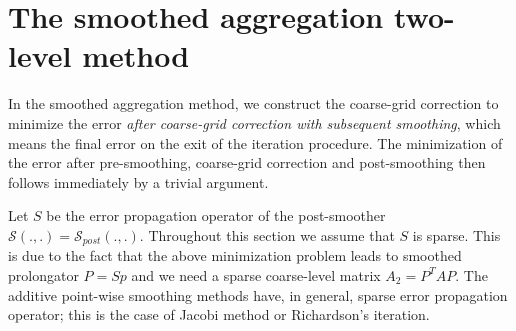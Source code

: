 \documentclass[twoside, 12pt]{article}
\begin{document}
\section{The smoothed aggregation two-level method}
In the smoothed aggregation method, we construct the coarse-grid
correction to minimize
the error {\em after coarse-grid correction with subsequent smoothing},
which means the final error on the exit of the iteration procedure.
The minimization of the error after pre-smoothing, coarse-grid correction
and post-smoothing then follows immediately by a trivial argument.

Let $S$ be the error propagation operator of the post-smoother
${\mathcal S}(.,.)={\mathcal S}_{post}(.,.)$.
Throughout this section we assume that $S$
is sparse. This is due to the fact that
the above minimization problem leads to smoothed prolongator
$P=Sp$
and we need a sparse coarse-level matrix $A_2=P^TAP$.
The additive point-wise smoothing methods have, in general, sparse
error propagation operator; this is the case of
Jacobi method or Richardson's iteration.
\end{document}
